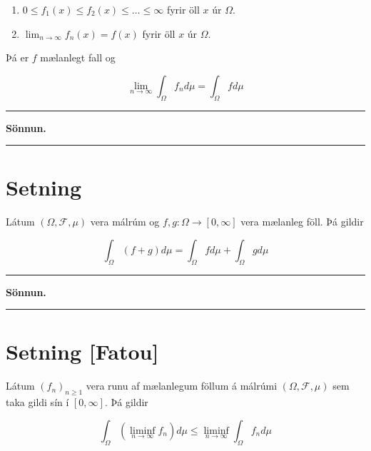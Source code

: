 \documentclass[]{book}
\begin{document}
\begin{enumerate}
\def\labelenumi{\arabic{enumi}.}
\item
  \(0\leq f_1(x) \leq f_2(x) \leq \dots \leq \infty\) fyrir öll \(x\) úr \(\Omega\).
\item
  \(\lim_{n\rightarrow\infty}f_n(x) = f(x)\) fyrir öll \(x\) úr \(\Omega\).
\end{enumerate}

Þá er \(f\) mælanlegt fall og

\[
\lim_{n\rightarrow\infty}\int_\Omega f_nd\mu = \int_\Omega f d\mu
\]

\begin{center}\rule{0.5\linewidth}{\linethickness}\end{center}

\textbf{Sönnun.}

\begin{center}\rule{0.5\linewidth}{\linethickness}\end{center}

\hypertarget{setning-47}{%
\section{Setning}\label{setning-47}}

Látum \((\Omega, \mathcal F, \mu)\) vera málrúm og \(f,g:\Omega\rightarrow [0,\infty]\) vera mælanleg föll. Þá gildir

\[
\int_{\Omega}(f + g)d\mu = \int_{\Omega}fd\mu + \int_\Omega gd\mu
\]

\begin{center}\rule{0.5\linewidth}{\linethickness}\end{center}

\textbf{Sönnun.}

\begin{center}\rule{0.5\linewidth}{\linethickness}\end{center}

\hypertarget{setning-fatou}{%
\section{Setning {[}Fatou{]}}\label{setning-fatou}}

Látum \((f_n)_{n\geq1}\) vera runu af mælanlegum föllum á málrúmi \((\Omega, \mathcal F, \mu)\) sem taka gildi sín í \([0, \infty]\). Þá gildir

\[
\int_\Omega(\liminf_{n\rightarrow\infty}f_n)d\mu \leq \liminf_{n\rightarrow\infty}\int_\Omega f_n d\mu
\]
\end{document}
